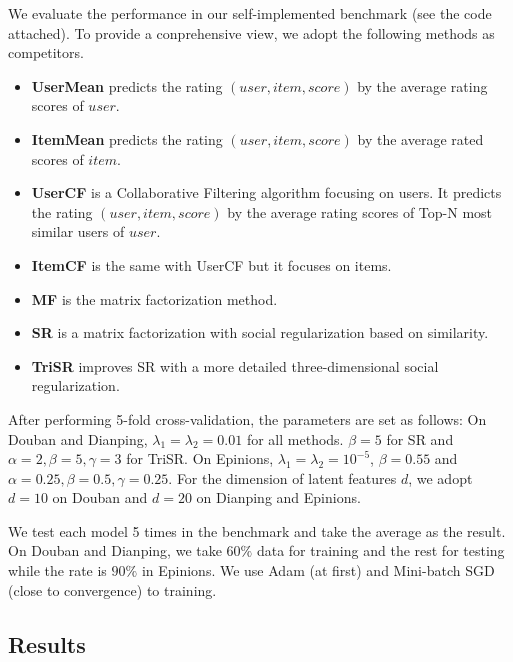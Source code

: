 \documentclass{article}
\begin{document}
We evaluate the performance in our self-implemented benchmark (see the code attached). 
To provide a conprehensive view, we adopt the following methods as competitors.
\begin{itemize}
  \item \textbf{UserMean} predicts the rating $(user, item, score)$ by the average rating scores of $user$.
  \item \textbf{ItemMean} predicts the rating $(user, item, score)$ by the average rated scores of $item$.
  \item \textbf{UserCF} is a Collaborative Filtering algorithm focusing on users. 
  It predicts the rating $(user, item, score)$ by the average rating scores of 
  Top-N most similar users of $user$.
  \item \textbf{ItemCF} \cite{Sarwar2001ItembasedCF} is the same with UserCF but it focuses on items.
  \item \textbf{MF} is the matrix factorization method.
  \item \textbf{SR} is a matrix factorization with social regularization based on similarity.
  \item \textbf{TriSR} improves SR with a more detailed three-dimensional social regularization.
\end{itemize}
After performing 5-fold cross-validation, the parameters are set as follows: 
On Douban and Dianping, $\lambda_1 = \lambda_2 = 0.01$ for all methods. $\beta = 5$ for SR and 
$\alpha=2, \beta=5, \gamma=3$ for TriSR. On Epinions, $\lambda_1 = \lambda_2 = 10^{-5}$, $\beta=0.55$ 
and $\alpha=0.25, \beta=0.5, \gamma=0.25$. For the dimension of latent 
features $d$, we adopt $d=10$ on Douban and $d=20$ on Dianping and Epinions. 

We test each model 5 times in the benchmark and take the average as the result. 
On Douban and Dianping, we take $60\%$ data for training and the rest for testing while 
the rate is $90\%$ in Epinions. We use Adam (at first) and Mini-batch SGD (close to convergence) to training.

\subsection{Results}
\end{document}
